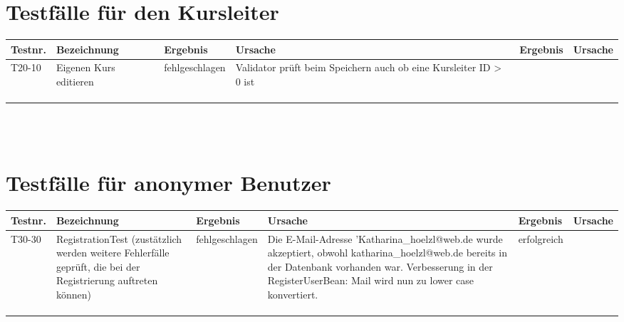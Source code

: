 \begin{landscape}
	\section{Testfälle für den Kursleiter}
		\begin{tabular}{|p{2.0cm} |p{5.0cm}|p{3.0cm}|p{5.0cm}|p{4.0cm}|p{4.0cm}|}
			\hline \textbf{Testnr.} & \textbf{Bezeichnung} & \textbf{Ergebnis} & \textbf{Ursache} & \textbf{Ergebnis} & \textbf{Ursache} \\
			\hline T20-10 & Eigenen Kurs editieren & fehlgeschlagen & Validator prüft beim Speichern auch ob eine Kursleiter ID > 0 ist &         &       \\
			\hline       &          &          &        &         &       \\
			\hline       &          &          &        &         &       \\
			\hline       &          &          &        &         &       \\
			\hline 
		\end{tabular} \ \\
		\ \\
				
	\section{Testfälle für anonymer Benutzer}
		\begin{tabular}{|p{2.0cm} |p{5.0cm}|p{3.0cm}|p{5.0cm}|p{4.0cm}|p{4.0cm}|}
			\hline \textbf{Testnr.} & \textbf{Bezeichnung} & \textbf{Ergebnis} & \textbf{Ursache} & \textbf{Ergebnis} & \textbf{Ursache} \\
			\hline   T30-30    & RegistrationTest (zustätzlich werden weitere Fehlerfälle geprüft, die bei der Registrierung auftreten können)   &   fehlgeschlagen       &    Die E-Mail-Adresse 'Katharina\_hoelzl@web.de wurde akzeptiert, obwohl katharina\_hoelzl@web.de bereits in der Datenbank vorhanden war. Verbesserung in der RegisterUserBean: Mail wird nun zu lower case konvertiert.    &    erfolgreich     &       \\
			\hline       &          &          &        &         &       \\
			\hline       &          &          &        &         &       \\
			\hline       &          &          &        &         &       \\
			\hline 
		\end{tabular} \ \\
		\ \\
			

\end{landscape}
